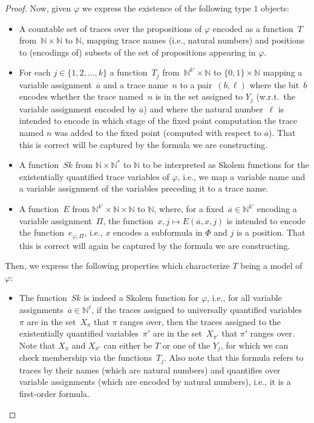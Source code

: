 \documentclass[dvipsnames,10pt,a4paper]{amsart}
\theoremstyle{definition}
\theoremstyle{remark}
\newcommand{\nats}{\mathbb{N}}
\renewcommand{\phi}{\varphi}
\newcommand{\set}[1]{\{#1\}}
\newcommand{\expansion}{e}
\newcommand{\skolem}{\mathit{Sk}}
\begin{document}
\begin{proof}
Now, given $\varphi$ we express the existence of the following type $1$ objects:
\begin{itemize}

    \item A countable set of traces over the propositions of $\varphi$ encoded as a function~$T$ from~$\nats \times \nats$ to $\nats$, mapping trace names (i.e., natural numbers) and positions to (encodings of) subsets of the set of propositions appearing in $\varphi$.

    \item For each $j \in \set{1,2,\ldots, k}$ a function~$T_j$ from~$\nats^{k'} \times \nats$ to $\set{0,1} \times \nats$ mapping a variable assignment~$\overline{a}$ and a trace name~$n$ to a pair~$(b,\ell)$ where the bit~$b$ encodes whether the trace named~$n$ is in the set assigned to $Y_j$ (w.r.t.\ the variable assignment encoded by $\overline{a}$) and where the natural number~$\ell$ is intended to encode in which stage of the fixed point computation the trace named $n$ was added to the fixed point (computed with respect to $\overline{a}$). That this is correct will be captured by the formula we are constructing.
 
    \item A function~$\skolem$ from $\nats \times \nats^*$
      to $\nats$ to be interpreted as Skolem functions for the existentially quantified trace variables of $\varphi$, i.e., we map a variable name and a variable assignment of the variables preceding it to a trace name. 

	\item A function~$E$ from $\nats^{k'} \times \nats \times \nats$ to $\nats$, where, for a fixed~$\overline{a} \in\nats^{k'}$ encoding a variable assignment~$\Pi$, the function~$x,j\mapsto E(\overline{a}, x, j)$ is intended to encode the function~$\expansion_{\phi,\Pi}$, i.e., $x$ encodes a subformula in $\Phi$ and $j$ is a position. That this is correct will again be captured by the formula we are constructing.
\end{itemize}

Then, we express the following properties which characterize $T$ being a model of $\varphi$:
\begin{itemize}

    \item The function~$\skolem$ is indeed a Skolem function for $\varphi$, i.e., for all variable assignments~$\overline{a} \in \nats^\ell$, if the traces assigned to universally quantified variables~$\pi$ are in the set~$X_\pi$ that $\pi$ ranges over, then the traces assigned to the existentially quantified variables~$\pi'$ are in the set~$X_{\pi'}$ that $\pi'$ ranges over. Note that $X_{\pi}$ and $X_{\pi'}$ can either be $T$ or one of the $Y_j$, for which we can check membership via the functions~$T_j$. Also note that this formula refers to traces by their names (which are natural numbers) and quantifies over variable assignments (which are encoded by natural numbers), i.e., it is a first-order formula.
    

\end{itemize}
\end{proof}
\end{document}
